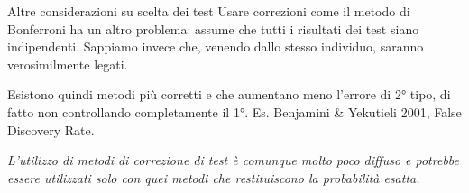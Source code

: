 \documentclass[
  ignorenonframetext,
]{beamer}
\begin{document}
\begin{frame}{Altre considerazioni su scelta dei test}
\label{altre-considerazioni-su-scelta-dei-test-1}
Usare correzioni come il metodo di Bonferroni ha un altro problema:
assume che tutti i risultati dei test siano indipendenti. Sappiamo
invece che, venendo dallo stesso individuo, saranno verosimilmente
legati.

Esistono quindi metodi più corretti e che aumentano meno l'errore di 2°
tipo, di fatto non controllando completamente il 1°. Es. Benjamini \&
Yekutieli 2001, False Discovery Rate.

\emph{L'utilizzo di metodi di correzione di test è comunque molto poco
diffuso e potrebbe essere utilizzati solo con quei metodi che
restituiscono la probabilità esatta.}
\end{frame}
\end{document}
